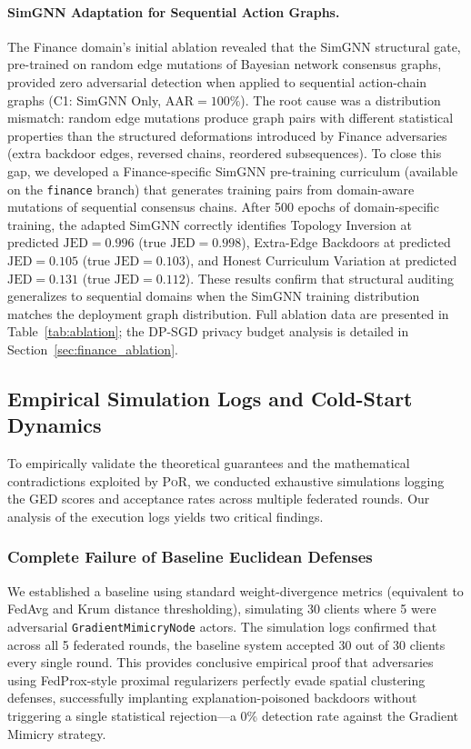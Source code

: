 \documentclass[journal]{IEEEtran}
\newcommand{\por}{\textsc{PoR}}
\begin{document}
\paragraph{SimGNN Adaptation for Sequential Action Graphs.}
The Finance domain's initial ablation revealed that the SimGNN structural
gate, pre-trained on random edge mutations of Bayesian network consensus
graphs, provided zero adversarial detection when applied to sequential
action-chain graphs (C1: SimGNN Only, $\text{AAR}=100\%$). The root cause
was a distribution mismatch: random edge mutations produce graph pairs with
different statistical properties than the structured deformations
introduced by Finance adversaries (extra backdoor edges, reversed chains,
reordered subsequences). To close this gap, we developed a
Finance-specific SimGNN pre-training curriculum (available on the
\texttt{finance} branch) that generates training pairs from domain-aware
mutations of sequential consensus chains. After 500 epochs of
domain-specific training, the adapted SimGNN correctly identifies Topology
Inversion at predicted $\text{JED}=0.996$ (true $\text{JED}=0.998$),
Extra-Edge Backdoors at predicted $\text{JED}=0.105$ (true
$\text{JED}=0.103$), and Honest Curriculum Variation at predicted
$\text{JED}=0.131$ (true $\text{JED}=0.112$). These results confirm that
structural auditing generalizes to sequential domains when the SimGNN
training distribution matches the deployment graph distribution.
Full ablation data are presented in Table~\ref{tab:ablation};
the DP-SGD privacy budget analysis is detailed in Section~\ref{sec:finance_ablation}.

\subsection{Empirical Simulation Logs and Cold-Start Dynamics}
\label{sec:coldstart}

To empirically validate the theoretical guarantees and the mathematical
contradictions exploited by \por{}, we conducted exhaustive simulations
logging the GED scores and acceptance rates across multiple federated rounds.
Our analysis of the execution logs yields two critical findings.

\subsubsection{Complete Failure of Baseline Euclidean Defenses}

We established a baseline using standard weight-divergence metrics (equivalent
to FedAvg and Krum distance thresholding), simulating 30 clients where 5 were
adversarial \texttt{GradientMimicryNode} actors. The simulation logs confirmed
that across all 5 federated rounds, the baseline system accepted 30 out of 30
clients every single round. This provides conclusive empirical proof that
adversaries using FedProx-style proximal regularizers perfectly evade spatial
clustering defenses, successfully implanting explanation-poisoned backdoors
without triggering a single statistical rejection---a 0\% detection rate
against the Gradient Mimicry strategy.
\end{document}
